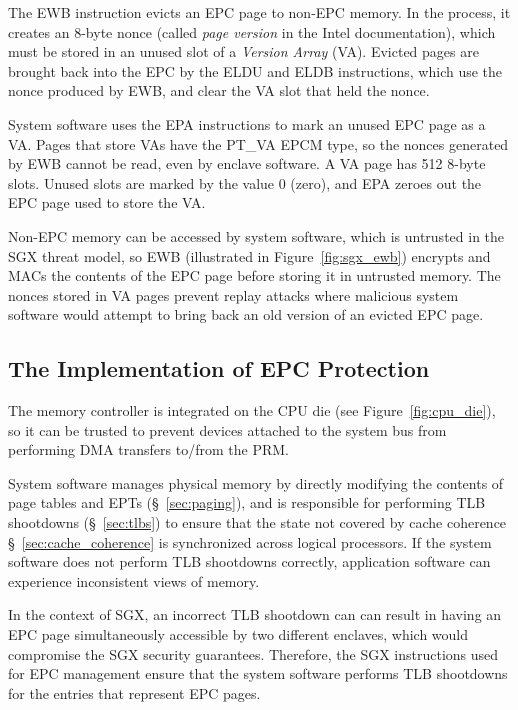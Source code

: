 The EWB instruction evicts an EPC page to non-EPC memory. In the process, it
creates an 8-byte nonce (called \textit{page version} in the Intel
documentation), which must be stored in an unused slot of a \textit{Version
Array} (VA). Evicted pages are brought back into the EPC by the ELDU and ELDB
instructions, which use the nonce produced by EWB, and clear the VA slot that
held the nonce.

System software uses the EPA instructions to mark an unused EPC page as a VA.
Pages that store VAs have the PT\_VA EPCM type, so the nonces generated by EWB
cannot be read, even by enclave software.  A VA page has 512 8-byte slots.
Unused slots are marked by the value 0 (zero), and EPA zeroes out the EPC page
used to store the VA.

Non-EPC memory can be accessed by system software, which is untrusted in the
SGX threat model, so EWB (illustrated in Figure~\ref{fig:sgx_ewb}) encrypts and
MACs the contents of the EPC page before storing it in untrusted memory. The
nonces stored in VA pages prevent replay attacks where malicious system
software would attempt to bring back an old version of an evicted EPC page.



\subsection {The Implementation of EPC Protection}

The memory controller is
integrated on the CPU die (see Figure~\ref{fig:cpu_die}), so it can be trusted
to prevent devices attached to the system bus from performing DMA transfers
to/from the PRM.

System software manages physical memory by directly modifying the contents of
page tables and EPTs (\S~\ref{sec:paging}), and is responsible for performing
TLB shootdowns (\S~\ref{sec:tlbs}) to ensure that the state not covered by
cache coherence \S~\ref{sec:cache_coherence} is synchronized across logical
processors. If the system software does not perform TLB shootdowns correctly,
application software can experience inconsistent views of memory.

In the context of SGX, an incorrect TLB shootdown can can result in having an
EPC page simultaneously accessible by two different enclaves, which would
compromise the SGX security guarantees. Therefore, the SGX instructions used
for EPC management ensure that the system software performs TLB shootdowns for
the entries that represent EPC pages.



